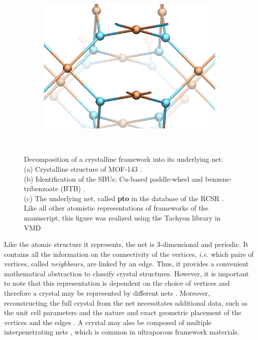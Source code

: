 \documentclass[main.tex]{subfiles}
\begin{document}
\begin{figure}[p]
\begin{subfigure}[t]{0.5\linewidth}
		\includegraphics[width=\linewidth]{figures/topology/mof14_3.jpg}
		\subcaption{}
	\end{subfigure}\\[5mm]
	\caption{Decomposition of a crystalline framework into its underlying net:\\
		(a) Crystalline structure of MOF-143 \autocite{MOF143}.\\
		(b) Identification of the SBUs: Cu-based paddle-wheel \autocite{ReverseTopologicalApproach} and benzene-tribenzoate (BTB) \autocite{BTB}.\\
		(c) The underlying net, called \textbf{pto} in the database of the RCSR \autocite{RCSR}.\\
	Like all other atomistic representations of frameworks of the manuscript, this figure was realized using the Tachyon\autocite{Tachyon} library in VMD\autocite{VMD}} \label{fig:mof}
\end{figure}

Like the atomic structure it represents, the net is 3-dimensional and periodic. It contains all the information on the connectivity of the vertices, \textit{i.e.} which pairs of vertices, called \emph{neighbours}, are linked by an edge. Thus, it provides a convenient mathematical abstraction to classify crystal structures. However, it is important to note that this representation is dependent on the choice of vertices and therefore a crystal may be represented by different nets \autocite{OKeeffe}. Moreover, reconstructing the full crystal from the net necessitates additional data, such as the unit cell parameters and the nature and exact geometric placement of the vertices and the edges \autocite{ReverseTopologicalApproach}. A crystal may also be composed of multiple interpenetrating nets \autocite{interpenetration}, which is common in ultraporous framework materials.
\end{document}
